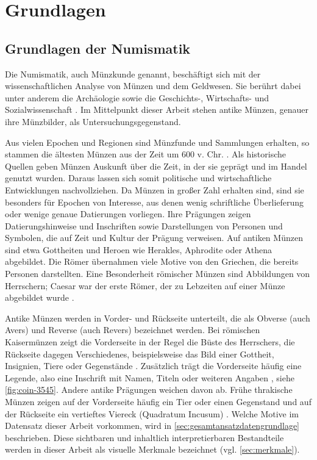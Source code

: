 
\chapter{Grundlagen}\label{ch:grundlagen}
\glsresetall %

\section{Grundlagen der Numismatik}
\label{sec:glnumismatik}
Die Numismatik, auch Münzkunde genannt, beschäftigt sich mit der wissenschaftlichen Analyse von Münzen und dem Geldwesen. Sie berührt dabei unter anderem die Archäologie sowie die Geschichts-, Wirtschafts- und Sozialwissenschaft \cite{wikipedia-numismatik}. Im Mittelpunkt dieser Arbeit stehen antike Münzen, genauer ihre Münzbilder, als Untersuchungsgegenstand.

Aus vielen Epochen und Regionen sind Münzfunde und Sammlungen erhalten, so stammen die ältesten Münzen aus der Zeit um 600 v. Chr. \cite{vonkaenel2012ersten}. Als historische Quellen geben Münzen Auskunft über die Zeit, in der sie geprägt und im Handel genutzt wurden. Daraus lassen sich somit politische und wirtschaftliche Entwicklungen nachvollziehen. Da Münzen in großer Zahl erhalten sind, sind sie besonders für Epochen von Interesse, aus denen wenig schriftliche Überlieferung oder wenige genaue Datierungen vorliegen. Ihre Prägungen zeigen Datierungshinweise und Inschriften sowie Darstellungen von Personen und Symbolen, die auf Zeit und Kultur der Prägung verweisen. Auf antiken Münzen sind etwa Gottheiten und Heroen wie Herakles, Aphrodite oder Athena abgebildet. Die Römer übernahmen viele Motive von den Griechen, die bereits Personen darstellten. Eine Besonderheit römischer Münzen sind Abbildungen von Herrschern; Caesar war der erste Römer, der zu Lebzeiten auf einer Münze abgebildet wurde \cite{howgego1995ancient,museumdigital-roemische-muenzen} . 

Antike Münzen werden in Vorder- und Rückseite unterteilt, die als Obverse (auch Avers) und Reverse (auch Revers) bezeichnet werden. Bei römischen Kaisermünzen zeigt die Vorderseite in der Regel die Büste des Herrschers, die Rückseite dagegen Verschiedenes, beispielsweise das Bild einer Gottheit, Insignien, Tiere oder Gegenstände \cite{museumdigital-roemische-muenzen}. Zusätzlich trägt die Vorderseite häufig eine Legende, also eine Inschrift mit Namen, Titeln oder weiteren Angaben \cite{cooper2020learning}, siehe \cref{fig:coin-3545}. Andere antike Prägungen weichen davon ab. Frühe thrakische Münzen zeigen auf der Vorderseite häufig ein Tier oder einen Gegenstand und auf der Rückseite ein vertieftes Viereck (Quadratum Incusum) \cite{berthold2016thrakien}. Welche Motive im Datensatz dieser Arbeit vorkommen, wird in \cref{sec:gesamtansatzdatengrundlage} beschrieben. Diese sichtbaren und inhaltlich interpretierbaren Bestandteile werden in dieser Arbeit als visuelle Merkmale bezeichnet (vgl. \cref{sec:merkmale}).

